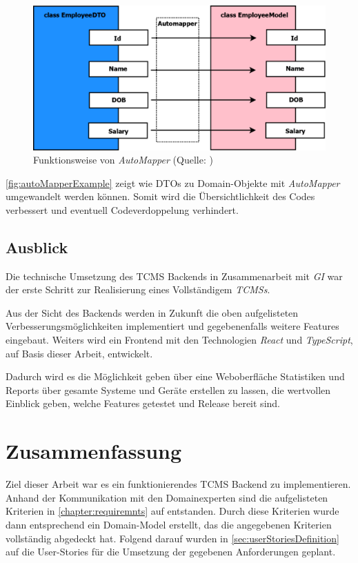 \documentclass[a4paper, fontsize=11pt, parskip=half, twoside]{scrreprt}
\begin{document}
	\begin{figure}[ht]
		\centering
		\includegraphics[scale=0.3]{assets/AutoMapper_example.png}
		\caption{Funktionsweise von \emph{AutoMapper} (Quelle: \textcite{sanjay_implement_2020})}
		\label{fig:autoMapperExample}
	\end{figure}

	\autoref{fig:autoMapperExample} zeigt wie \ac{DTO}s zu Domain-Objekte mit \emph{AutoMapper} umgewandelt werden können.
	Somit wird die Übersichtlichkeit des Codes verbessert und eventuell Codeverdoppelung verhindert.
	
	\section{Ausblick}
	Die technische Umsetzung des \ac{TCMS} Backends in Zusammenarbeit mit \emph{\acl{GI}} war der erste Schritt zur Realisierung eines Vollständigem \emph{\acl{TCMS}s}.
	
	Aus der Sicht des Backends werden in Zukunft die oben aufgelisteten Verbesserungsmöglichkeiten implementiert und gegebenenfalls weitere Features eingebaut.
	Weiters wird ein Frontend mit den Technologien \emph{React} und \emph{TypeScript}, auf Basis dieser Arbeit, entwickelt.
	
	Dadurch wird es die Möglichkeit geben über eine Weboberfläche Statistiken und Reports über gesamte Systeme und Geräte erstellen zu lassen, die wertvollen Einblick geben, welche Features getestet und Release bereit sind.
	
	\chapter{Zusammenfassung}
	Ziel dieser Arbeit war es ein funktionierendes \ac{TCMS} Backend zu implementieren. 
	Anhand der Kommunikation mit den Domainexperten sind die aufgelisteten Kriterien in \autoref{chapter:requiremnts} auf  entstanden.
	Durch diese Kriterien wurde dann entsprechend ein Domain-Model erstellt, das die angegebenen Kriterien vollständig abgedeckt hat.
	Folgend darauf wurden in \autoref{sec:userStoriesDefinition} auf  die User-Stories für die Umsetzung der gegebenen Anforderungen geplant.	
	
\end{document}
